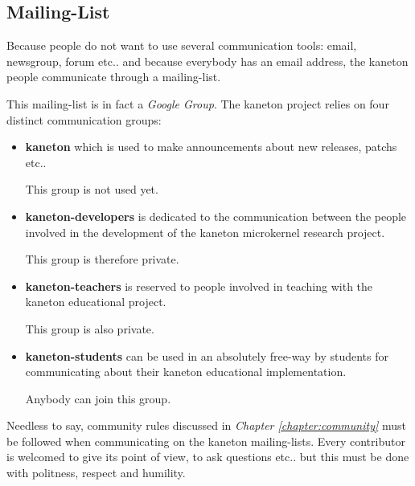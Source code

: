 %
%
%
%
%
%

%
%

\subsection{Mailing-List}
\label{section:mailing-list}

Because people do not want to use several communication tools: email,
newsgroup, forum etc.. and because everybody has an email address, the
kaneton people communicate through a mailing-list.

This mailing-list is in fact a \textit{Google Group}. The kaneton
project relies on four distinct communication groups:

\begin{itemize}
  \item
    \textbf{kaneton} which is used to make announcements about new releases,
    patchs etc..

    \-

    This group is not used yet.
  \item
    \textbf{kaneton-developers} is dedicated to the communication between the
    people involved in the development of the kaneton microkernel research
    project.

    \-

    This group is therefore private.
  \item
    \textbf{kaneton-teachers} is reserved to people involved in teaching
    with the kaneton educational project.

    \-

    This group is also private.
  \item
    \textbf{kaneton-students} can be used in an absolutely free-way by
    students for communicating about their kaneton educational implementation.

    \-

    Anybody can join this group.
\end{itemize}

Needless to say, community rules discussed in \textit{Chapter
\ref{chapter:community}} must be followed when communicating on the kaneton
mailing-lists. Every contributor is welcomed to give its point of view, to
ask questions etc.. but this must be done with politness, respect and humility.

